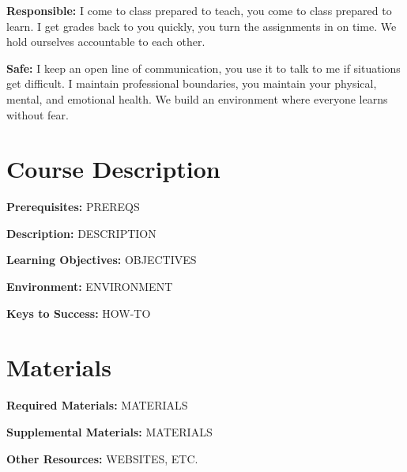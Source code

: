\documentclass[12pt]{article}
\begin{document}
\textbf{Responsible:} I come to class prepared to teach, you come to class prepared to learn. I get grades back to you quickly, you turn the assignments in on time. We hold ourselves accountable to each other.

\textbf{Safe:} I keep an open line of communication, you use it to talk to me if situations get difficult. I maintain professional boundaries, you maintain your physical, mental, and emotional health. We build an environment where everyone learns without fear.

\bigbreak
\noindent\makebox[\linewidth]{\rule{0.9\paperwidth}{1pt}}


\section*{Course Description}
\textbf{Prerequisites:} PREREQS

\textbf{Description:} DESCRIPTION

\textbf{Learning Objectives:} OBJECTIVES

\textbf{Environment:} ENVIRONMENT

\textbf{Keys to Success:} HOW-TO

\bigbreak
\noindent\makebox[\linewidth]{\rule{0.9\paperwidth}{1pt}}


\section*{Materials}
\textbf{Required Materials:} MATERIALS

\textbf{Supplemental Materials:} MATERIALS

\textbf{Other Resources:} WEBSITES, ETC.

\bigbreak
\noindent\makebox[\linewidth]{\rule{0.9\paperwidth}{1pt}}


\end{document}
